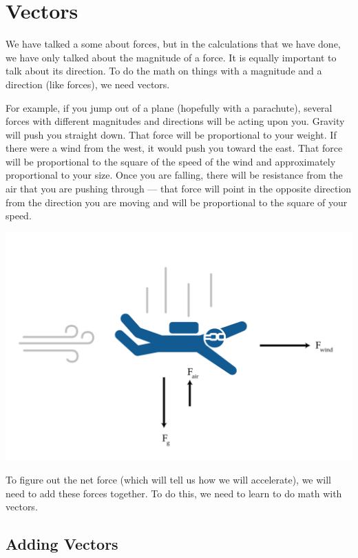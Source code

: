 \chapter{Vectors}

We have talked a some about forces, but in the calculations that we
have done, we have only talked about the magnitude of a force. It is
equally important to talk about its direction. To do the math on
things with a magnitude and a direction (like forces), we need vectors.

For example, if you jump out of a plane (hopefully with a parachute), 
several forces with different magnitudes and directions will be acting upon 
you. Gravity will push you straight down. That force will be proportional to 
your weight. If there were a wind from the west, it would push you toward the 
east. That force will be proportional to the square of the speed of the wind 
and approximately proportional to your size. Once you are falling, there will 
be resistance from the air that you are pushing through --- that force will 
point in the opposite direction from the direction you are moving and will be 
proportional to the square of your speed.

\includegraphics[width=1\textwidth]{skydiver.png}

To figure out the net force (which will tell us how we will accelerate), we 
will need to add these forces together. To do this, we need to learn to do 
math with vectors.

\section{Adding Vectors}

